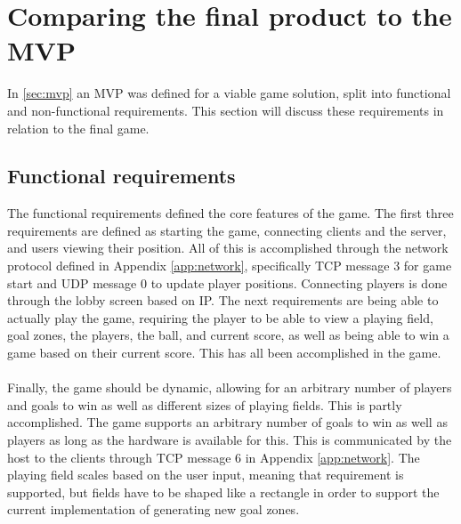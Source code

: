 \section{Comparing the final product to the MVP}\label{sec:discussmvp}
In \autoref{sec:mvp} an MVP was defined for a viable game solution, split into functional and non-functional requirements. This section will discuss these requirements in relation to the final game.

\subsection{Functional requirements}
The functional requirements defined the core features of the game.
The first three requirements are defined as starting the game, connecting clients and the server, and users viewing their position.
All of this is accomplished through the network protocol defined in Appendix \autoref{app:network}, specifically TCP message 3 for game start and UDP message 0 to update player positions.
Connecting players is done through the lobby screen based on IP.
The next requirements are being able to actually play the game, requiring the player to be able to view a playing field, goal zones, the players, the ball, and current score, as well as being able to win a game based on their current score.
This has all been accomplished in the game.
\\\\
Finally, the game should be dynamic, allowing for an arbitrary number of players and goals to win as well as different sizes of playing fields.
This is partly accomplished.
The game supports an arbitrary number of goals to win as well as players as long as the hardware is available for this.
This is communicated by the host to the clients through TCP message 6 in Appendix \autoref{app:network}.
The playing field scales based on the user input, meaning that requirement is supported, but fields have to be shaped like a rectangle in order to support the current implementation of generating new goal zones.

